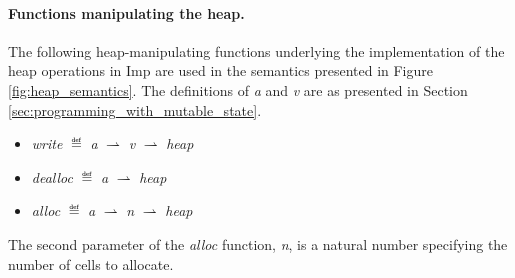 \paragraph{Functions manipulating the heap.}
The following heap-manipulating functions underlying the implementation of the heap operations in Imp are used in the semantics presented in Figure \ref{fig:heap_semantics}. The definitions of {\it a} and {\it v} are as presented in Section \ref{sec:programming_with_mutable_state}.
\begin{itemize}
\item {\it write} $\eqdef$ {\it a} $\rightharpoonup$ {\it v} $\rightharpoonup$ {\it heap}
\item {\it dealloc} $\eqdef$ {\it a} $\rightharpoonup$ {\it heap}
\item {\it alloc} $\eqdef$ {\it a} $\rightharpoonup$ {\it n} $\rightharpoonup$ {\it heap}
\end{itemize}
The second parameter of the {\it alloc} function, {\it n}, is a natural number specifying the number of cells to allocate.


